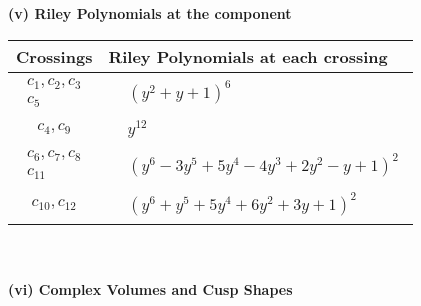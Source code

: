 \documentclass[1p]{elsarticle_modified}
\theoremstyle{definition}
\begin{document}
\newpage\renewcommand{\arraystretch}{1}
\flushleft \textbf{(v) Riley Polynomials at the component}\newline \\
\begin{tabular}{m{50pt}|m{274pt}}
Crossings & \hspace{64pt}Riley Polynomials at each crossing \\
\hline $$\begin{aligned}c_{1},c_{2},c_{3}\\c_{5}\end{aligned}$$&$\begin{aligned}
&(y^2+y+1)^6
\end{aligned}$\\
\hline $$\begin{aligned}c_{4},c_{9}\end{aligned}$$&$\begin{aligned}
&y^{12}
\end{aligned}$\\
\hline $$\begin{aligned}c_{6},c_{7},c_{8}\\c_{11}\end{aligned}$$&$\begin{aligned}
&(y^6-3 y^5+5 y^4-4 y^3+2 y^2- y+1)^2
\end{aligned}$\\
\hline $$\begin{aligned}c_{10},c_{12}\end{aligned}$$&$\begin{aligned}
&(y^6+y^5+5 y^4+6 y^2+3 y+1)^2
\end{aligned}$\\
\hline
\end{tabular}\\~\\
\newpage\flushleft \textbf{(vi) Complex Volumes and Cusp Shapes}
\end{document}
